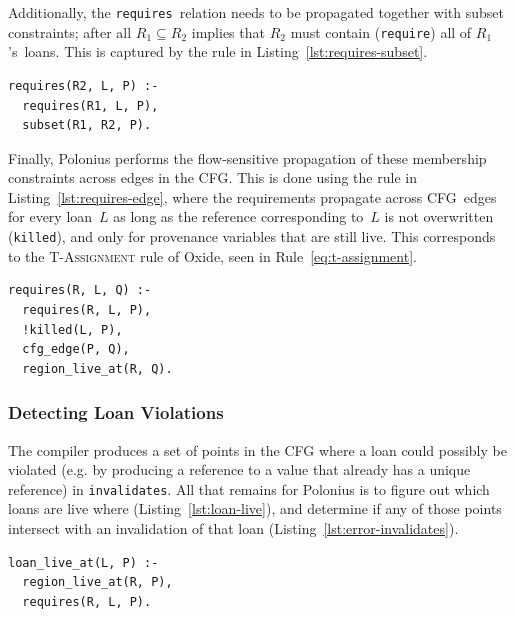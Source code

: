 \documentclass[11pt,a4paper,twoside,openany]{report}
\newenvironment{sourcecode}{\captionsetup{type=listing}}{}
\newcommand{\InDatalog}[1]{\texttt{#1}}
\begin{document}
Additionally, the \InDatalog{requires}~relation needs to be propagated together
with subset constraints; after all $R_1 \subseteq R_2$ implies that $R_2$ must
contain (\InDatalog{require}) all of $R_1$'s~loans. This is captured by the rule
in Listing~\ref{lst:requires-subset}.

\begin{sourcecode}
  \label{lst:requires-subset}
\begin{verbatim}
requires(R2, L, P) :- 
  requires(R1, L, P), 
  subset(R1, R2, P).
\end{verbatim}
\end{sourcecode}

Finally, Polonius performs the flow-sensitive propagation of these membership
constraints across edges in the CFG. This is done using the rule in
Listing~\ref{lst:requires-edge}, where the requirements propagate across
CFG~edges for every loan~$L$ as long as the reference corresponding to~$L$ is
not overwritten (\InDatalog{killed}), and only for provenance variables that are
still live. This corresponds to the \textsc{T-Assignment} rule of Oxide, seen in
Rule~\eqref{eq:t-assignment}.

\begin{sourcecode}
  \label{lst:requires-edge}
\begin{verbatim}
requires(R, L, Q) :-
  requires(R, L, P),
  !killed(L, P),
  cfg_edge(P, Q),
  region_live_at(R, Q).
\end{verbatim}
\end{sourcecode}


\subsubsection{Detecting Loan Violations}

The compiler produces a set of points in the CFG where a loan could possibly be
violated (e.g. by producing a reference to a value that already has a unique
reference) in \InDatalog{invalidates}. All that remains for Polonius is to
figure out which loans are live where (Listing~\ref{lst:loan-live}), and
determine if any of those points intersect with an invalidation of that loan
(Listing~\ref{lst:error-invalidates}).

\begin{sourcecode}
  \label{lst:loan-live}
\begin{verbatim}
loan_live_at(L, P) :-
  region_live_at(R, P),
  requires(R, L, P).
\end{verbatim}
\end{sourcecode}
\end{document}
